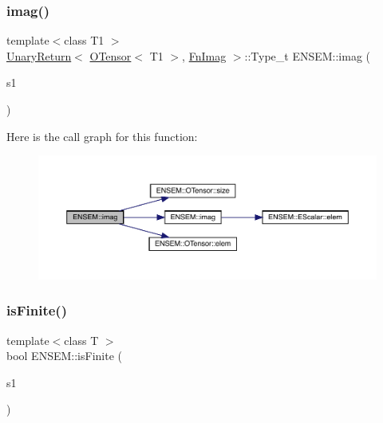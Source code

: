 \subsubsection{\texorpdfstring{imag()}{imag()}}
{\footnotesize\ttfamily template$<$class T1 $>$ \\
\mbox{\hyperlink{structENSEM_1_1UnaryReturn}{Unary\+Return}}$<$ \mbox{\hyperlink{classENSEM_1_1OTensor}{O\+Tensor}}$<$ T1 $>$, \mbox{\hyperlink{structENSEM_1_1FnImag}{Fn\+Imag}} $>$\+::Type\+\_\+t E\+N\+S\+E\+M\+::imag (\begin{DoxyParamCaption}\item[{const \mbox{\hyperlink{classENSEM_1_1OTensor}{O\+Tensor}}$<$ T1 $>$ \&}]{s1 }\end{DoxyParamCaption})\hspace{0.3cm}{\ttfamily [inline]}}

Here is the call graph for this function\+:\nopagebreak
\begin{figure}[H]
\begin{center}
\leavevmode
\includegraphics[width=350pt]{de/d87/group__obstensor_ga8fd330e1f2838b575c200fc264a4d95b_cgraph}
\end{center}
\end{figure}
\mbox{\label{group__obstensor_ga79f475f3909487c15b04b4561acc06ef}} 
\subsubsection{\texorpdfstring{isFinite()}{isFinite()}}
{\footnotesize\ttfamily template$<$class T $>$ \\
bool E\+N\+S\+E\+M\+::is\+Finite (\begin{DoxyParamCaption}\item[{const \mbox{\hyperlink{classENSEM_1_1OTensor}{O\+Tensor}}$<$ T $>$ \&}]{s1 }\end{DoxyParamCaption})}



